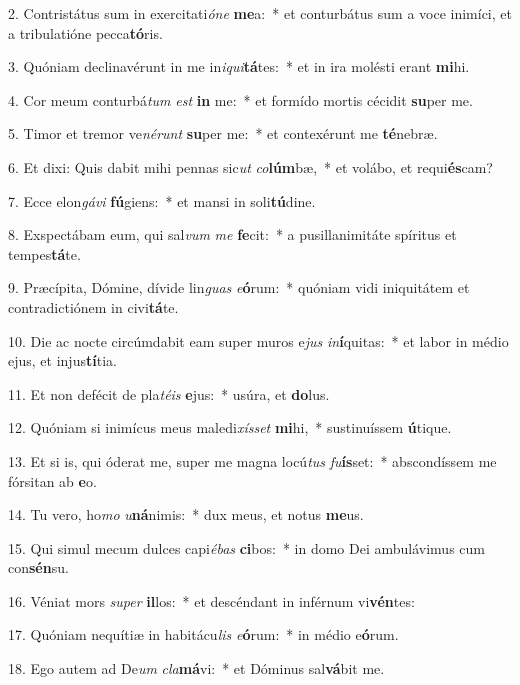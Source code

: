 2. Contristátus sum in exercitati\textit{ó}\textit{ne} \textbf{me}a:~*  et conturbátus sum a voce inimíci, et a tribulatióne pecca\textbf{tó}ris.\

3. Quóniam declinavérunt in me in\textit{i}\textit{qui}\textbf{tá}tes:~*  et in ira molésti erant \textbf{mi}hi.\

4. Cor meum conturbá\textit{tum} \textit{est} \textbf{in} me:~*  et formído mortis cécidit \textbf{su}per me.\

5. Timor et tremor ve\textit{né}\textit{runt} \textbf{su}per me:~*  et contexérunt me \textbf{té}nebræ.\

6. Et dixi: Quis dabit mihi pennas sic\textit{ut} \textit{co}\textbf{lúm}bæ,~*  et volábo, et requi\textbf{és}cam?\

7. Ecce elon\textit{gá}\textit{vi} \textbf{fú}giens:~*  et mansi in soli\textbf{tú}dine.\

8. Exspectábam eum, qui sal\textit{vum} \textit{me} \textbf{fe}cit:~*  a pusillanimitáte spíritus et tempes\textbf{tá}te.\

9. Præcípita, Dómine, dívide lin\textit{guas} \textit{e}\textbf{ó}rum:~*  quóniam vidi iniquitátem et contradictiónem in civi\textbf{tá}te.\

10. Die ac nocte circúmdabit eam super muros e\textit{jus} \textit{in}\textbf{í}quitas:~*  et labor in médio ejus, et injus\textbf{tí}tia.\

11. Et non defécit de pla\textit{té}\textit{is} \textbf{e}jus:~*  usúra, et \textbf{do}lus.\

12. Quóniam si inimícus meus maledi\textit{xís}\textit{set} \textbf{mi}hi,~*  sustinuíssem \textbf{ú}tique.\

13. Et si is, qui óderat me, super me magna locú\textit{tus} \textit{fu}\textbf{ís}set:~*  abscondíssem me fórsitan ab \textbf{e}o.\

14. Tu vero, ho\textit{mo} \textit{u}\textbf{ná}nimis:~*  dux meus, et notus \textbf{me}us.\

15. Qui simul mecum dulces capi\textit{é}\textit{bas} \textbf{ci}bos:~*  in domo Dei ambulávimus cum con\textbf{sén}su.\

16. Véniat mors \textit{su}\textit{per} \textbf{il}los:~*  et descéndant in inférnum vi\textbf{vén}tes:\

17. Quóniam nequítiæ in habitácu\textit{lis} \textit{e}\textbf{ó}rum:~*  in médio e\textbf{ó}rum.\

18. Ego autem ad De\textit{um} \textit{cla}\textbf{má}vi:~*  et Dóminus sal\textbf{vá}bit me.\

